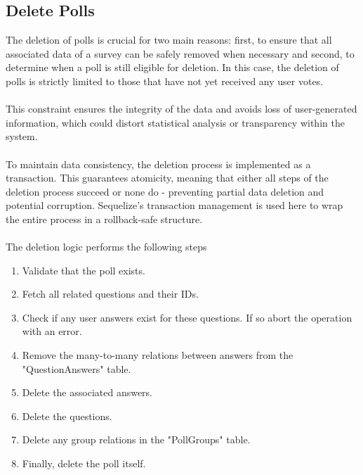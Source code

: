 \documentclass[a4paper,12pt]{report}
\begin{document}
\subsection{Delete Polls}
The deletion of polls is crucial for two main reasons: first, to ensure that all associated data of a survey can be safely removed when necessary and second, to determine when a poll is still eligible for deletion. In this case, the deletion of polls is strictly limited to those that have not yet received any user votes. \\ \\
This constraint ensures the integrity of the data and avoids loss of user-generated information, which could distort statistical analysis or transparency within the system.\\ \\
To maintain data consistency, the deletion process is implemented as a transaction. This guarantees atomicity, meaning that either all steps of the deletion process succeed or none do - preventing partial data deletion and potential corruption. Sequelize's transaction management is used here to wrap the entire process in a rollback-safe structure. \parencite{sequelizedoku} \\ \\
The deletion logic performs the following steps
\begin{enumerate}
	\item Validate that the poll exists.
	\item Fetch all related questions and their IDs.
	\item Check if any user answers exist for these questions. If so abort the operation with an error.
	\item Remove the many-to-many relations between answers from the "QuestionAnswers" table.
	\item Delete the associated answers.
	\item Delete the questions.
	\item Delete any group relations in the "PollGroups" table.
	\item Finally, delete the poll itself.
\end{enumerate}
\end{document}
